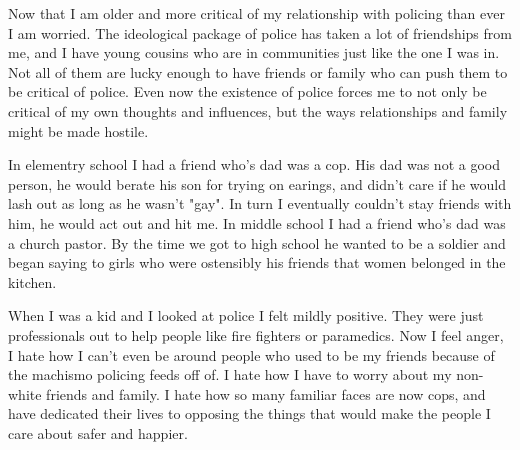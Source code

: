 \documentclass{report}
\begin{document}
Now that I am older and more critical of my relationship with
policing than ever I am worried. The ideological package of police
has taken a lot of friendships from me, and I have young cousins
who are in communities just like the one I was in. Not all of them
are lucky enough to have friends or family who can push them
to be critical of police. Even now the existence of police forces
me to not only be critical of my own thoughts and influences,
but the ways relationships and family might be made hostile.

In elementry school I had a friend who's dad was a cop.
His dad was not a good person, he would berate his son for
trying on earings, and didn't care if he would lash out as long
as he wasn't "gay". In turn I eventually couldn't stay friends
with him, he would act out and hit me. In middle school I had
a friend who's dad was a church pastor. By the time we got to
high school he wanted to be a soldier and began saying to
girls who were ostensibly his friends that women belonged in the
kitchen. 

When I was a kid and I looked at police I felt mildly positive.
They were just professionals out to help people like fire fighters
or paramedics. Now I feel anger, I hate how I can't even be around
people who used to be my friends because of the machismo 
policing feeds off of. I hate how I have to worry about my
non-white friends and family. I hate how so many familiar faces
are now cops, and have dedicated their lives to opposing
the things that would make the people I care about safer and
happier.
\end{document}
